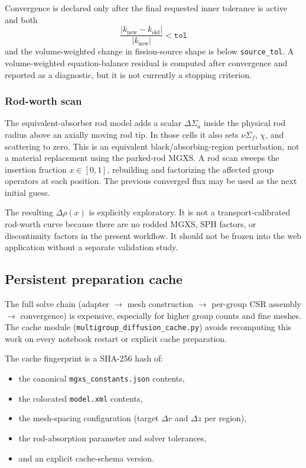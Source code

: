 \documentclass[11pt]{article}
\begin{document}
Convergence is declared only after the final requested inner tolerance is
active and both
\[
\frac{|k_{\mathrm{new}}-k_{\mathrm{old}}|}
{|k_{\mathrm{new}}|}<\texttt{tol}
\]
and the volume-weighted change in fission-source shape is below
\texttt{source\_tol}.  A volume-weighted equation-balance residual is computed
after convergence and reported as a diagnostic, but it is not currently a
stopping criterion.

\subsubsection{Rod-worth scan}

The equivalent-absorber rod model adds a scalar $\Delta\Sigma_a$ inside the
physical rod radius above an axially moving rod tip.  In those cells it also
sets $\nu\Sigma_f$, $\chi$, and scattering to zero.  This is an equivalent
black/absorbing-region perturbation, not a material replacement using the
parked-rod MGXS.  A rod scan sweeps the insertion fraction
$x \in [0,1]$, rebuilding and factorizing the affected group operators at each
position.  The previous converged flux may be used as the next initial guess.

The resulting $\Delta\rho(x)$ is explicitly exploratory.  It is not a
transport-calibrated rod-worth curve because there are no rodded MGXS, SPH
factors, or discontinuity factors in the present workflow.  It should not be
frozen into the web application without a separate validation study.

\subsection{Persistent preparation cache}

The full solve chain (adapter $\to$ mesh construction $\to$ per-group CSR
assembly $\to$ convergence) is expensive, especially for higher group counts
and fine meshes.  The cache module
(\texttt{multigroup\_diffusion\_cache.py}) avoids recomputing this work on
every notebook restart or explicit cache preparation.

The cache fingerprint is a SHA-256 hash of:
\begin{itemize}
  \item the canonical \texttt{mgxs\_constants.json} contents,
  \item the colocated \texttt{model.xml} contents,
  \item the mesh-spacing configuration (target $\Delta r$ and $\Delta z$ per
        region),
  \item the rod-absorption parameter and solver tolerances,
  \item and an explicit cache-schema version.
\end{itemize}
\end{document}
